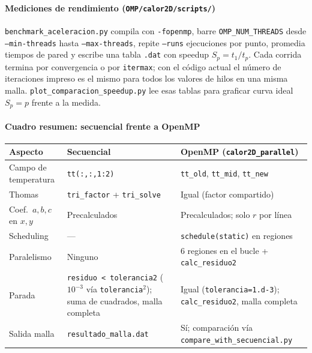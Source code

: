 \documentclass[11pt,a4paper]{article}
\begin{document}
\paragraph{Mediciones de rendimiento (\texttt{OMP/calor2D/scripts/})}

\medskip

\texttt{benchmark\_aceleracion.py} compila con \texttt{-fopenmp}, barre
\texttt{OMP\_NUM\_THREADS} desde \texttt{--min-threads} hasta \texttt{--max-threads},
repite \texttt{--runs} ejecuciones por punto, promedia tiempos de pared y escribe una tabla
\texttt{.dat} con speedup $S_p=t_1/t_p$. Cada corrida termina por convergencia o por
\texttt{itermax}; con el c\'odigo actual el n\'umero de iteraciones impreso es el mismo
para todos los valores de hilos en una misma malla. \texttt{plot\_comparacion\_speedup.py}
lee esas tablas para graficar curva ideal $S_p=p$ frente a la medida.

\paragraph{Cuadro resumen: secuencial frente a OpenMP}

\medskip

\begin{center}
\small
\begin{tabular}{lM{5.1cm}M{5.4cm}}
\hline
Aspecto & Secuencial & OpenMP (\texttt{calor2D\_parallel}) \\
\hline
Campo de temperatura & \texttt{tt(:,:,1:2)} & \texttt{tt\_old}, \texttt{tt\_mid}, \texttt{tt\_new} \\
Thomas & \texttt{tri\_factor} + \texttt{tri\_solve} & Igual (factor compartido) \\
Coef.\ $a,b,c$ en $x,y$ & Precalculados & Precalculados; solo $r$ por l\'inea \\
Scheduling & --- & \texttt{schedule(static)} en regiones \\
Paralelismo & Ninguno & 6 regiones en el bucle + \texttt{calc\_residuo2} \\
Parada &
  \texttt{residuo < tolerancia2} ($10^{-3}$ v\'ia \texttt{tolerancia}$^2$); \newline
  suma de cuadrados, malla completa &
  Igual (\texttt{tolerancia=1.d-3}); \newline
  \texttt{calc\_residuo2}, malla completa \\
Salida malla & \texttt{resultado\_malla.dat} &
  S\'i; comparaci\'on v\'ia \newline \texttt{compare\_with\_secuencial.py} \\
\hline
\end{tabular}
\end{center}
\end{document}
